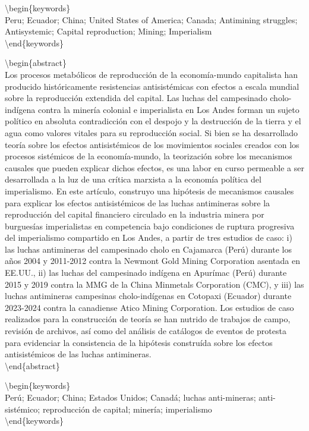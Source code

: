\documentclass[
]{article}
\begin{document}
\textbackslash begin\{keywords\}\\
Peru; Ecuador; China; United States of America; Canada; Antimining
struggles; Antisystemic; Capital reproduction; Mining; Imperialism\\
\textbackslash end\{keywords\}

\textbackslash begin\{abstract\}\\
Los procesos metabólicos de reproducción de la economía-mundo
capitalista han producido históricamente resistencias antisistémicas con
efectos a escala mundial sobre la reproducción extendida del capital.
Las luchas del campesinado cholo-indígena contra la minería colonial e
imperialista en Los Andes forman un sujeto político en absoluta
contradicción con el despojo y la destrucción de la tierra y el agua
como valores vitales para su reproducción social. Si bien se ha
desarrollado teoría sobre los efectos antisistémicos de los movimientos
sociales creados con los procesos sistémicos de la economía-mundo, la
teorización sobre los mecanismos causales que pueden explicar dichos
efectos, es una labor en curso permeable a ser desarrollada a la luz de
una crítica marxista a la economía política del imperialismo. En este
artículo, construyo una hipótesis de mecanismos causales para explicar
los efectos antisistémicos de las luchas antimineras sobre la
reproducción del capital financiero circulado en la industria minera por
burguesías imperialistas en competencia bajo condiciones de ruptura
progresiva del imperialismo compartido en Los Andes, a partir de tres
estudios de caso: i) las luchas antimineras del campesinado cholo en
Cajamarca (Perú) durante los años 2004 y 2011-2012 contra la Newmont
Gold Mining Corporation asentada en EE.UU., ii) las luchas del
campesinado indígena en Apurímac (Perú) durante 2015 y 2019 contra la
MMG de la China Minmetals Corporation (CMC), y iii) las luchas
antimineras campesinas cholo-indígenas en Cotopaxi (Ecuador) durante
2023-2024 contra la canadiense Atico Mining Corporation. Los estudios de
caso realizados para la construcción de teoría se han nutrido de
trabajos de campo, revisión de archivos, así como del análisis de
catálogos de eventos de protesta para evidenciar la consistencia de la
hipótesis construída sobre los efectos antisistémicos de las luchas
antimineras.\\
\textbackslash end\{abstract\}

\textbackslash begin\{keywords\}\\
Perú; Ecuador; China; Estados Unidos; Canadá; luchas anti-mineras;
anti-sistémico; reproducción de capital; minería; imperialismo\\
\textbackslash end\{keywords\}
\end{document}
